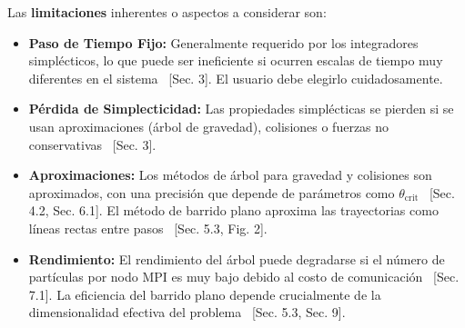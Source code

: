 Las \textbf{limitaciones} inherentes o aspectos a considerar son:
\begin{itemize}
    \item \textbf{Paso de Tiempo Fijo:} Generalmente requerido por los integradores simplécticos, lo que puede ser ineficiente si ocurren escalas de tiempo muy diferentes en el sistema~\cite{Rein2012} [Sec. 3]. El usuario debe elegirlo cuidadosamente.
    \item \textbf{Pérdida de Simplecticidad:} Las propiedades simplécticas se pierden si se usan aproximaciones (árbol de gravedad), colisiones o fuerzas no conservativas~\cite{Rein2012} [Sec. 3].
    \item \textbf{Aproximaciones:} Los métodos de árbol para gravedad y colisiones son aproximados, con una precisión que depende de parámetros como $\theta_{\text{crit}}$~\cite{Rein2012} [Sec. 4.2, Sec. 6.1]. El método de barrido plano aproxima las trayectorias como líneas rectas entre pasos~\cite{Rein2012} [Sec. 5.3, Fig. 2].
    \item \textbf{Rendimiento:} El rendimiento del árbol puede degradarse si el número de partículas por nodo MPI es muy bajo debido al costo de comunicación~\cite{Rein2012} [Sec. 7.1]. La eficiencia del barrido plano depende crucialmente de la dimensionalidad efectiva del problema~\cite{Rein2012} [Sec. 5.3, Sec. 9].
\end{itemize}
